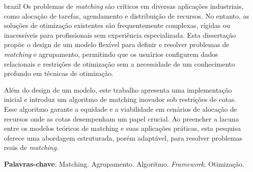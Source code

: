 
\setlength{\absparsep}{18pt} %
\begin{resumo}[RESUMO]
 \begin{otherlanguage*}{brazil}
Os problemas de \textit{matching} são críticos em diversas aplicações industriais, como alocação de tarefas, agendamento e distribuição de recursos. No entanto, as soluções de otimização existentes são frequentemente complexas, rígidas ou inacessíveis para profissionais sem experiência especializada. Esta dissertação propõe o design de um modelo flexível para definir e resolver problemas de \textit{matching} e agrupamento, permitindo que os usuários configurem dados relacionais e restrições de otimização sem a necessidade de um conhecimento profundo em técnicas de otimização.

Além do design de um modelo, este trabalho apresenta uma implementação inicial e introduz um algoritmo de matching inovador sob restrições de cotas. Esse algoritmo garante a equidade e a viabilidade em cenários de alocação de recursos onde as cotas desempenham um papel crucial. Ao preencher a lacuna entre os modelos teóricos de matching e suas aplicações práticas, esta pesquisa oferece uma abordagem estruturada, porém adaptável, para resolver problemas reais de \textit{matching}.

\textbf{Palavras-chave}: Matching. Agrupamento. Algoritmo. \textit{Framework}. Otimização.
\end{otherlanguage*}
\end{resumo}
